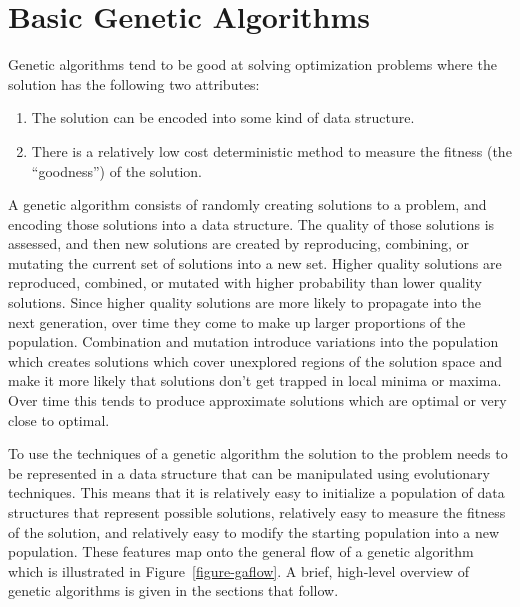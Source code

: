 \section{Basic Genetic Algorithms}

Genetic algorithms tend to be good at solving optimization problems where the
solution has the following two attributes:

\begin{enumerate}
  \item {The solution can be encoded into some kind of data structure.}
  \item {There is a relatively low cost deterministic method to measure the
  fitness (the ``goodness'') of the solution.}
\end{enumerate}

A genetic algorithm consists of randomly creating solutions to a problem, and
encoding those solutions into a data structure. The quality of those solutions
is assessed, and then new solutions are created by reproducing, combining, or
mutating the current set of solutions into a new set. Higher quality solutions
are reproduced, combined, or mutated with higher probability than lower quality
solutions. Since higher quality solutions are more likely to propagate into the
next generation, over time they come to make up larger proportions of the
population. Combination and mutation introduce variations into the population
which creates solutions which cover unexplored regions of the solution space and
make it more likely that solutions don't get trapped in local minima or maxima.
Over time this tends to produce approximate solutions which are optimal or very
close to optimal.

To use the techniques of a genetic algorithm the solution to the problem needs
to be represented in a data structure that can be manipulated using evolutionary
techniques. This means that it is relatively easy to initialize a population of
data structures that represent possible solutions, relatively easy to measure
the fitness of the solution, and relatively easy to modify the starting
population into a new population. These features map onto the general flow of a
genetic algorithm which is illustrated in Figure~\ref{figure-gaflow}. A brief,
high-level overview of genetic algorithms is given in the sections that follow.


